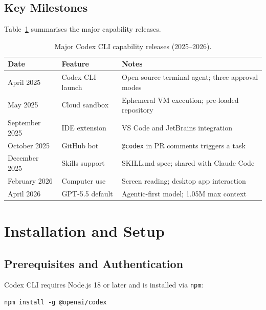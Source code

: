 \subsection{Key Milestones}
\label{app:codex:milestones}

Table~\ref{tab:codex-milestones} summarises the major capability releases.

\begin{table}[ht]
\centering
\caption{Major Codex CLI capability releases (2025--2026).}
\label{tab:codex-milestones}
\begin{tabular}{lll}
\toprule
\textbf{Date} & \textbf{Feature} & \textbf{Notes} \\
\midrule
April 2025     & Codex CLI launch      & Open-source terminal agent; three approval modes \\
May 2025       & Cloud sandbox         & Ephemeral VM execution; pre-loaded repository \\
September 2025 & IDE extension         & VS Code and JetBrains integration \\
October 2025   & GitHub bot            & \texttt{@codex} in PR comments triggers a task \\
December 2025  & Skills support        & SKILL.md spec; shared with Claude Code \\
February 2026  & Computer use          & Screen reading; desktop app interaction \\
April 2026     & GPT-5.5 default       & Agentic-first model; 1.05M max context \\
\bottomrule
\end{tabular}
\end{table}

\section{Installation and Setup}
\label{app:codex:setup}

\subsection{Prerequisites and Authentication}
\label{app:codex:install}

Codex CLI requires Node.js 18 or later and is installed via \texttt{npm}:

\begin{verbatim}
npm install -g @openai/codex
\end{verbatim}

